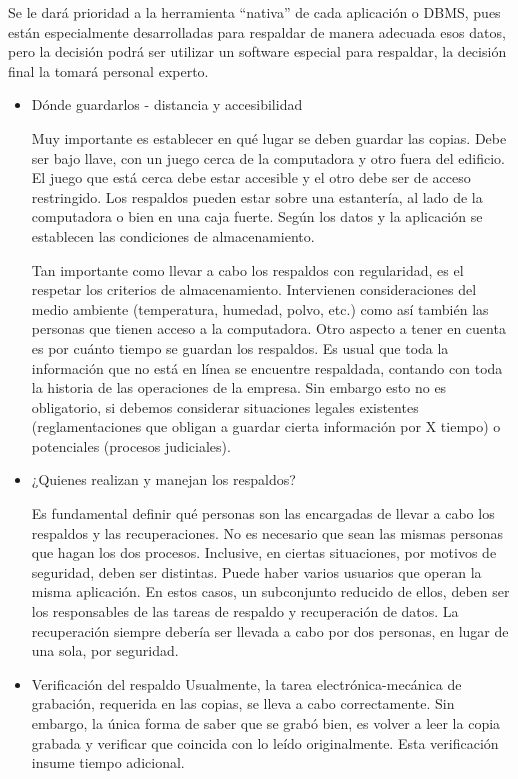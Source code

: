 \documentclass[a4paper,openright,12pt]{book}
\begin{document}
Se le dará prioridad a la herramienta “nativa” de cada aplicación o DBMS, pues están especialmente desarrolladas para respaldar de manera adecuada esos datos, pero la decisión podrá ser utilizar un software especial para respaldar, la decisión final la tomará personal experto. 
\begin{itemize}
\item Dónde guardarlos - distancia y accesibilidad  

Muy importante es establecer en qué lugar se deben guardar las copias. Debe ser bajo llave, con un juego cerca de la computadora y otro fuera del edificio. El juego que está cerca debe estar accesible y el otro debe ser de acceso restringido. Los respaldos pueden estar sobre una estantería, al lado de la computadora o bien en una caja fuerte. Según los datos y la aplicación se establecen las condiciones de almacenamiento. 

Tan importante como llevar a cabo los respaldos con regularidad, es el respetar los criterios de almacenamiento. Intervienen consideraciones del medio ambiente (temperatura, humedad, polvo, etc.) como así también las personas que tienen acceso a la computadora.  
Otro aspecto a tener en cuenta es por cuánto tiempo se guardan los respaldos. Es usual que toda la información que no está en línea se encuentre respaldada, contando con toda la historia de las operaciones de la empresa. Sin embargo esto no es obligatorio, si debemos considerar situaciones legales existentes (reglamentaciones que obligan a guardar cierta información por X tiempo) o potenciales (procesos judiciales). 

\item ¿Quienes realizan y manejan los  respaldos?
 
Es fundamental definir qué personas son las encargadas de llevar a cabo los respaldos y las recuperaciones. No es necesario que sean las mismas personas que hagan los dos procesos. Inclusive, en ciertas situaciones, por motivos de seguridad, deben ser distintas. Puede haber varios usuarios que operan la misma aplicación. En estos casos, un subconjunto reducido de ellos, deben ser los responsables de las tareas de respaldo y recuperación de datos. La recuperación siempre debería ser llevada a cabo por dos personas, en lugar de una sola, por seguridad.

\item Verificación del respaldo 
Usualmente, la tarea electrónica-mecánica de grabación, requerida en las copias, se lleva a cabo correctamente. Sin embargo, la única forma de saber que se grabó bien, es volver a leer la copia grabada y verificar que coincida con lo leído originalmente. Esta verificación insume tiempo adicional. 
 

\end{itemize}
\end{document}
